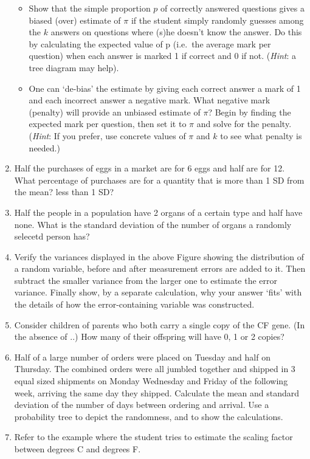 \documentclass[]{book}
\providecommand{\tightlist}{%
  \setlength{\itemsep}{0pt}\setlength{\parskip}{0pt}}
\begin{document}
\begin{enumerate}
  \begin{itemize}
  \tightlist
  \item
    Show that the simple proportion \(p\) of correctly answered questions gives a biased (over) estimate of \(\pi\) if the student simply randomly guesses among the \(k\) answers on questions where (s)he doesn't know the answer. Do this by calculating the expected value of p (i.e.~the average mark per question) when each answer is marked 1 if correct and 0 if not. (\emph{Hint}: a tree diagram may help).
  \item
    One can `de-bias' the estimate by giving each correct answer a mark of 1 and each incorrect answer a negative mark. What negative mark (penalty) will provide an unbiased estimate of \(\pi\)? Begin by finding the expected mark per question, then set it to \(\pi\) and solve for the penalty. (\emph{Hint}: If you prefer, use concrete values of \(\pi\) and \(k\) to see what penalty is needed.)
  \end{itemize}
\item
  Half the purchases of eggs in a market are for 6 eggs and half are for 12. What percentage of purchases are for a quantity that is more than 1 SD from the mean? less than 1 SD?
\item
  Half the people in a population have 2 organs of a certain type and half have none. What is the standard deviation of the number of organs a randomly selecetd person has?
\item
  Verify the variances displayed in the above Figure showing the distribution of a random variable, before and after measurement errors are added to it. Then subtract the smaller variance from the larger one to estimate the error variance. Finally show, by a separate calculation, why your answer `fits' with the details of how the error-containing variable was constructed.
\item
  Consider children of parents who both carry a single copy of the CF gene. (In the absence of ..) How many of their offspring will have 0, 1 or 2 copies?
\item
  Half of a large number of orders were placed on Tuesday and half on Thursday. The combined orders were all jumbled together and shipped in 3 equal sized shipments on Monday Wednesday and Friday of the following week, arriving the same day they shipped. Calculate the mean and standard deviation of the number of days between ordering and arrival. Use a probability tree to depict the randomness, and to show the calculations.
\item
  Refer to the example where the student tries to estimate the scaling factor between degrees C and degrees F.
\end{enumerate}
\end{document}
